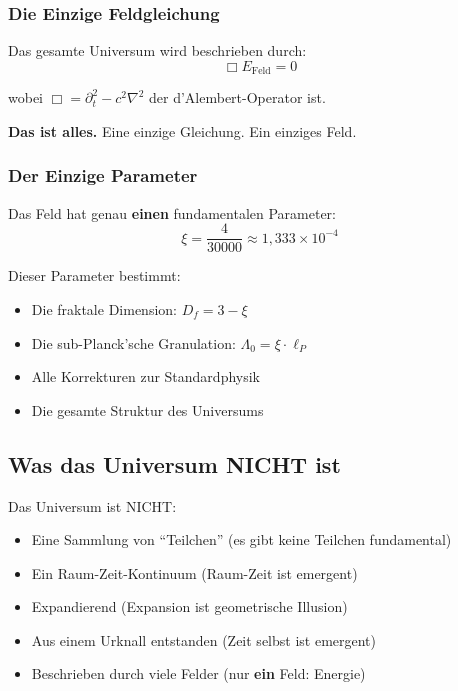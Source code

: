 	\subsubsection{Die Einzige Feldgleichung}
	
	Das gesamte Universum wird beschrieben durch:
	\begin{equation}
		\boxed{\Box E_{\text{Feld}} = 0}
	\end{equation}
	
	wobei $\Box = \partial_t^2 - c^2 \nabla^2$ der d'Alembert-Operator ist.
	
	\textbf{Das ist alles.} Eine einzige Gleichung. Ein einziges Feld.
	
	\subsubsection{Der Einzige Parameter}
	
	Das Feld hat genau \textbf{einen} fundamentalen Parameter:
	\begin{equation}
		\boxed{\xi = \frac{4}{30000} \approx 1{,}333 \times 10^{-4}}
	\end{equation}
	
	Dieser Parameter bestimmt:
	\begin{itemize}
		\item Die fraktale Dimension: $D_f = 3 - \xi$
		\item Die sub-Planck'sche Granulation: $\Lambda_0 = \xi \cdot \ell_P$
		\item Alle Korrekturen zur Standardphysik
		\item Die gesamte Struktur des Universums
	\end{itemize}
	
	\subsection{Was das Universum NICHT ist}
	
	\begin{important}
		Das Universum ist NICHT:
		\begin{itemize}
			\item Eine Sammlung von \enquote{Teilchen} (es gibt keine Teilchen fundamental)
			\item Ein Raum-Zeit-Kontinuum (Raum-Zeit ist emergent)
			\item Expandierend (Expansion ist geometrische Illusion)
			\item Aus einem Urknall entstanden (Zeit selbst ist emergent)
			\item Beschrieben durch viele Felder (nur \textbf{ein} Feld: Energie)
		\end{itemize}
	\end{important}
	
